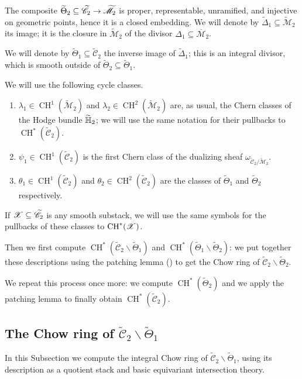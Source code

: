 \documentclass[a4paper, 10pt]{amsart}
\numberwithin{equation}{section}
\numberwithin{subsection}{section}
\newenvironment{enumerate1}
{\begin{enumerate}[\upshape (1)]}
	{\end{enumerate}}
\theoremstyle{definition}
\theoremstyle{remark}
\renewcommand{\mathcal}{\mathscr}
\newcommand\cM{\mathcal{M}} \newcommand\cN{\mathcal{N}}
\newcommand\arr{\ifinner\to\else\longrightarrow\fi}
\newcommand{\Mbar}{\overline{\cM}}
\newcommand{\Mtilde}{\widetilde{\mathcal M}}
\newcommand{\Ctilde}{\widetilde{\mathcal C}}
\newcommand{\Dtilde}{\widetilde{\Delta}}
\newcommand{\ThTilde}{\widetilde{\Theta}}
\newcommand{\ch}[1][*]{\operatorname{CH}^{#1}}
\newcommand{\htil}{\widetilde{\HH}}
\begin{document}
	The composite $\ThTilde_{2} \subseteq \Ctilde_{2} \arr \Mtilde_{2}$ is proper, representable, unramified, and injective on geometric points, hence it is a closed embedding. We will denote by $\Dtilde_{1} \subseteq \Mtilde_{2}$ its image; it is the closure in $\Mtilde_{2}$ of the divisor $\Delta_{1} \subseteq\Mbar_{2}$.
	
	We will denote by $\ThTilde_{1} \subseteq \Ctilde_{2}$ the inverse image of $\Dtilde_{1}$; this is an integral divisor, which is smooth outside of $\ThTilde_{2} \subseteq \ThTilde_{1}$.
	
	
	We will use the following cycle classes.
	
	\begin{enumerate1}
		
		\item $\lambda_{1} \in \ch[1](\Mtilde_{2})$ and $\lambda_{2} \in \ch[2](\Mtilde_{2})$ are, as usual, the Chern classes of the Hodge bundle $\htil_{2}$; we will use the same notation for their pullbacks to $\ch(\Ctilde_{2})$.
		
		\item $\psi_{1} \in \ch[1](\Ctilde_{2})$ is the first Chern class of the dualizing sheaf $\omega_{\Ctilde_{2}/\Mtilde_{2}}$.
		
		\item $\theta_{1} \in \ch[1](\Ctilde_{2})$ and $\theta_{2} \in \ch[2](\Ctilde_{2})$ are the classes of $\ThTilde_{1}$ and $\ThTilde_{2}$ respectively.
		
	\end{enumerate1}
	
	If $\cX \subseteq \Ctilde_{2}$ is any smooth substack, we will use the same symbols for the pullbacks of these classes to $\ch(\cX)$.
	
	Then we first compute $\ch(\Ctilde_2\smallsetminus\ThTilde_1)$ and $\ch(\ThTilde_1\smallsetminus\ThTilde_2)$: we put together these descriptions using the patching lemma () to get the Chow ring of $\Ctilde_2\smallsetminus\ThTilde_2$. 
	
	We repeat this process once more: we compute $\ch(\ThTilde_2)$ and we apply the patching lemma to finally obtain $\ch(\Ctilde_2)$.
	\subsection{The Chow ring of $\Ctilde_2\smallsetminus\ThTilde_1$}\label{c2-d1}
	In this Subsection we compute the integral Chow ring of $\Ctilde_2\smallsetminus\ThTilde_1$, using its description as a quotient stack and basic equivariant intersection theory.
	
\end{document}

